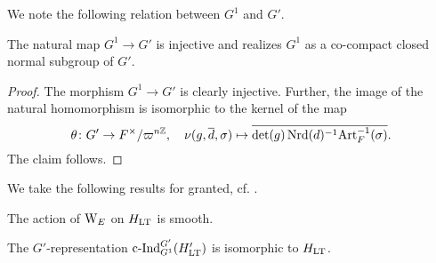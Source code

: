 \documentclass[../main.tex]{subfiles}
\begin{document}
We note the following relation between $G^1$ and $G'$.
\begin{lem}\label{lem:G1subG}
  The natural map $G^1 \to G'$ is injective and realizes $G^1$ as a co-compact closed
  normal subgroup of $G'$.
\begin{proof}
  The morphism $G^1 \to G'$ is clearly injective. Further, the image of the natural
  homomorphism is isomorphic to the kernel of the map 
  \begin{equation*}
   \theta \colon G' \to F^\times/\varpi^{n\mathbb{Z}}, \quad \nu(g, \overline d, \sigma) \mapsto 
 \overline{\det(g)\operatorname{Nrd}(d)^{-1}\mathrm{Art}_F^{-1}(\sigma)}.
  \end{equation*}
  The claim follows.
\end{proof}
\end{lem}

We take the following results for granted, cf. \cite[Section 4]{mieda2016geometric}.
\begin{lem}\label{lem:GActsSmoothlyOnHLT}
  The action of $\mathrm W_E$ on $H_{\mathrm{LT}}$ is smooth.
\end{lem}

\begin{lem}\label{lem:InductionStatementOnHLT}
  The $G'$-representation $\mathrm{c\text{-}Ind}_{G^1}^{G'} (H'_{\mathrm{LT}})$ is isomorphic to $H_{\mathrm{LT}}$. 
\end{lem}


\end{document}
